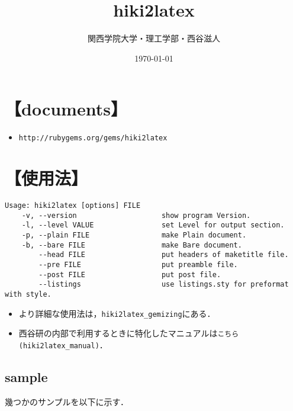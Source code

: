 \documentclass[10pt,a4jpaper]{jsarticle}
\begin{document}
\title{hiki2latex}
\author{関西学院大学・理工学部・西谷滋人}
\date{\today}
\maketitle

\tableofcontents
\section{【documents】}\begin{itemize}
\item \verb|http://rubygems.org/gems/hiki2latex|
\end{itemize}
\section{【使用法】}\begin{lstlisting}[style=customCsh]
Usage: hiki2latex [options] FILE
    -v, --version                    show program Version.
    -l, --level VALUE                set Level for output section.
    -p, --plain FILE                 make Plain document.
    -b, --bare FILE                  make Bare document.
        --head FILE                  put headers of maketitle file.
        --pre FILE                   put preamble file.
        --post FILE                  put post file.
        --listings                   use listings.sty for preformat with style.
\end{lstlisting}\begin{itemize}
\item より詳細な使用法は，\verb|hiki2latex_gemizing|にある．
\item 西谷研の内部で利用するときに特化したマニュアルは\verb|こちら(hiki2latex_manual)|．
\end{itemize}
\subsection{sample}
幾つかのサンプルを以下に示す．
\end{document}
